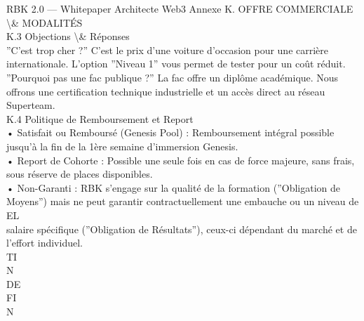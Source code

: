 \documentclass[12pt,landscape,a4paper]{article}
\begin{document}
RBK 2.0 — Whitepaper Architecte Web3                                                                           Annexe K. OFFRE COMMERCIALE \textbackslash{}& MODALITÉS\\
\vspace{0.5em}
\vspace{0.5em}
\vspace{0.5em}
K.3 Objections \textbackslash{}& Réponses\\
”C’est trop cher ?” C’est le prix d’une voiture d’occasion pour une carrière internationale. L’option ”Niveau 1” vous permet de tester pour un coût réduit.\\
”Pourquoi pas une fac publique ?” La fac offre un diplôme académique. Nous offrons une certification technique industrielle et un accès direct au réseau\\
Superteam.\\
\vspace{0.5em}
\vspace{0.5em}
\vspace{0.5em}
K.4 Politique de Remboursement et Report\\
• Satisfait ou Remboursé (Genesis Pool) : Remboursement intégral possible jusqu’à la fin de la 1ère semaine d’immersion Genesis.\\
\vspace{0.5em}
• Report de Cohorte : Possible une seule fois en cas de force majeure, sans frais, sous réserve de places disponibles.\\
\vspace{0.5em}
• Non-Garanti : RBK s’engage sur la qualité de la formation (”Obligation de Moyens”) mais ne peut garantir contractuellement une embauche ou un niveau de\\
\vspace{0.5em}
\vspace{0.5em}
\vspace{0.5em}
\vspace{0.5em}
EL\\
salaire spécifique (”Obligation de Résultats”), ceux-ci dépendant du marché et de l’effort individuel.\\
\vspace{0.5em}
\vspace{0.5em}
\vspace{0.5em}
\vspace{0.5em}
TI\\
N\\
DE\\
FI\\
N\\
\end{document}
